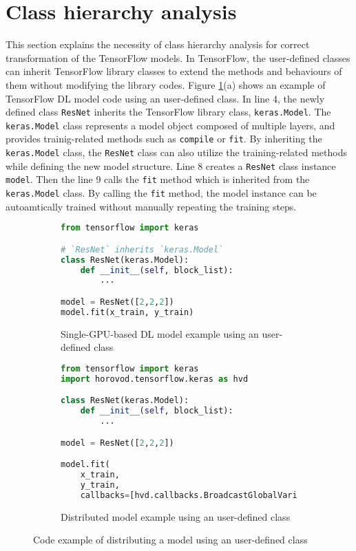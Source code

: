 \section{Class hierarchy analysis}\label{sec:cha}

This section explains the necessity of class hierarchy analysis for correct
transformation of the TensorFlow models.
In TensorFlow, the user-defined classes can inherit TensorFlow library classes
to extend the methods and behaviours of them without modifying the library codes. 
Figure \ref{fig:cha:tfex}(a) shows an example of TensorFlow DL model
code using an user-defined class.
In line 4, the newly defined class {\tt ResNet} inherits the TensorFlow
library class, {\tt keras.Model}.
The {\tt keras.Model} class represents a model object composed of multiple
layers, and provides trainig-related methods such as {\tt compile} or {\tt fit}.
By inheriting the {\tt keras.Model} class, the {\tt ResNet} class
can also utilize the training-related methods while defining the new model
structure.
Line 8 creates a {\tt ResNet} class instance {\tt model}.
Then the line 9 calls the {\tt fit} method which is inherited from the
{\tt keras.Model} class.
By calling the {\tt fit} method, the model instance can be autoamtically
trained without manually repeating the training steps.

\begin{figure}[!ht]
  \centering
  \begin{subfigure}[t]{0.35\textwidth}
    \begin{lstlisting}[language=Python]
from tensorflow import keras

# `ResNet` inherits `keras.Model`
class ResNet(keras.Model): 
    def __init__(self, block_list):
        ...

model = ResNet([2,2,2])
model.fit(x_train, y_train)\end{lstlisting}
    \caption{Single-GPU-based DL model example using an user-defined class}
  \end{subfigure}
  \hspace{3mm}
  \begin{subfigure}[t]{0.6\textwidth}
    \begin{lstlisting}[language=Python]
from tensorflow import keras
import horovod.tensorflow.keras as hvd

class ResNet(keras.Model):
    def __init__(self, block_list):
        ...

model = ResNet([2,2,2])

model.fit(
    x_train, 
    y_train,
    callbacks=[hvd.callbacks.BroadcastGlobalVariablesCallback(0)])\end{lstlisting}
    \caption{Distributed model example using an user-defined class}
  \end{subfigure}

  \caption{Code example of distributing a model using an user-defined class}
  \label{fig:cha:tfex}
\end{figure}

